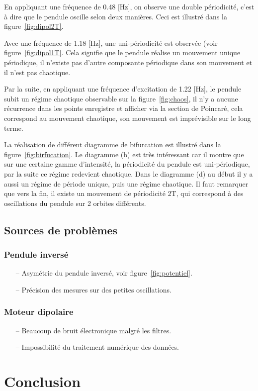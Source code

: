 \documentclass[a4paper,12pt,oneside]{article}
\begin{document}
En appliquant une fréquence de 0.48 [Hz], on observe une double périodicité, c'est à dire que le pendule oscille selon deux manières.%
Ceci est illustré dans la figure~\ref{fig:dipol2T}.

Avec une fréquence de 1.18 [Hz], une uni-périodicité est observée (voir figure~\ref{fig:dipol1T}. Cela signifie que le pendule réalise un mouvement unique périodique, il n'existe pas d'autre composante périodique dans son mouvement et il n'est pas chaotique.

Par la suite, en appliquant une fréquence d'excitation de 1.22 [Hz], le pendule subit un régime chaotique observable sur la figure~\ref{fig:chaos}, il n'y a aucune récurrence dans les points enregistre et afficher via la section de Poincaré, cela correspond au mouvement chaotique, son mouvement est imprévisible sur le long terme.


La réalisation de différent diagramme de bifurcation est illustré dans la figure~\ref{fig:birfucation}. Le diagramme (b) est très intéressant car il montre que sur une certaine gamme d'intensité, la périodicité du pendule est uni-périodique, par la suite ce régime redevient chaotique.
Dans le diagramme (d) au début il y a aussi un régime de période unique, puis une régime chaotique. Il faut remarquer que vers la fin, il existe un mouvement de périodicité 2T, qui correspond à des oscillations du pendule sur 2 orbites différents.

\subsection{Sources de problèmes}

\subsubsection{Pendule inversé}
\begin{itemize}
	\item[--] Asymétrie du pendule inversé, voir figure~\ref{fig:potentiel}.
	\item[--] Précision des mesures sur des petites oscillations.
\end{itemize}

\subsubsection{Moteur dipolaire}
\begin{itemize}
	\item[--] Beaucoup de bruit électronique malgré les filtres.
	\item[--] Impossibilité du traitement numérique des données.
\end{itemize}


\section{Conclusion}






\begin{thebibliography}{99}
\end{thebibliography}
\end{document}
